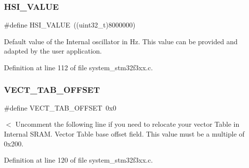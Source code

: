 \mbox{\label{group___s_t_m32_f3xx___system___private___defines_gaaa8c76e274d0f6dd2cefb5d0b17fbc37}} 
\subsubsection{H\+S\+I\+\_\+\+V\+A\+L\+UE}
{\footnotesize\ttfamily \#define H\+S\+I\+\_\+\+V\+A\+L\+UE~((uint32\+\_\+t)8000000)}

Default value of the Internal oscillator in Hz. This value can be provided and adapted by the user application. 

Definition at line 112 of file system\+\_\+stm32f3xx.\+c.

\mbox{\label{group___s_t_m32_f3xx___system___private___defines_ga40e1495541cbb4acbe3f1819bd87a9fe}} 
\subsubsection{V\+E\+C\+T\+\_\+\+T\+A\+B\+\_\+\+O\+F\+F\+S\+ET}
{\footnotesize\ttfamily \#define V\+E\+C\+T\+\_\+\+T\+A\+B\+\_\+\+O\+F\+F\+S\+ET~0x0}

$<$ Uncomment the following line if you need to relocate your vector Table in Internal S\+R\+AM. Vector Table base offset field. This value must be a multiple of 0x200. 

Definition at line 120 of file system\+\_\+stm32f3xx.\+c.

